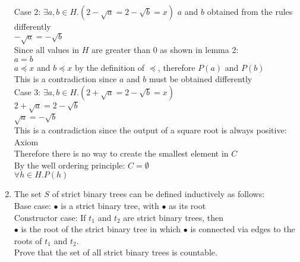 \documentclass[11pt]{article}
\begin{document}
\begin{enumerate}
\begin{solution}
\null\qquad Case 2: $\exists a,b\in H.(2-\sqrt a = 2-\sqrt b = x)$ $a$ and $b$ obtained from the rules differently\\
\null\qquad $-\sqrt a = -\sqrt b$\\
\null\qquad Since all values in $H$ are greater than $0$ as shown in lemma 2:\\
\null\qquad $a = b$\\
\null\qquad $a\preccurlyeq x$ and $b\preccurlyeq x$ by the definition of $\preccurlyeq$, therefore $P(a)$ and $P(b)$\\
\null\qquad This is a contradiction since $a$ and $b$ must be obtained differently\\
\null\qquad Case 3: $\exists a,b\in H.(2+\sqrt a = 2-\sqrt b = x)$\\
\null\qquad $2+\sqrt a = 2-\sqrt b$ \\
\null\qquad $\sqrt a = -\sqrt b$\\
\null\qquad This is a contradiction since the output of a square root is always positive: Axiom\\
\null\quad Therefore there is no way to create the smallest element in $C$\\
By the well ordering principle: $C=\emptyset$\\
$\forall h\in H.P(h)$
\end{solution}

\item
\begin{question}
The set $S$ of strict binary trees can be defined inductively as follows:\\
Base case: $\bullet$ is a strict binary tree, with $\bullet$ as its root\\
Constructor case: If $t_1$ and $t_2$ are strict binary trees, then\\
$\bullet$ is the root of the strict binary tree in which $\bullet$ is connected via edges to the roots of $t_1$ and $t_2$.\\

Prove that the set of all strict binary trees is countable.
\end{question}


\end{enumerate}
\end{document}
